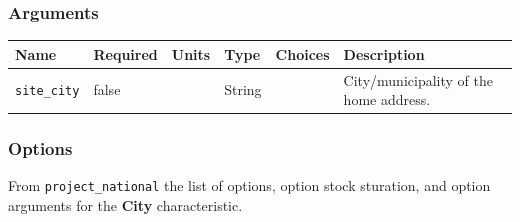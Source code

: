 \subsubsection{Arguments}\label{arguments-5}

\begin{longtable}[]{@{}llllll@{}}
\toprule\noalign{}
Name & Required & Units & Type & Choices & Description \\
\midrule\noalign{}
\endhead
\bottomrule\noalign{}
\endlastfoot
\texttt{site\_city} & false & & String & & City/municipality of the home
address. \\
\end{longtable}

\subsubsection{Options}\label{options-14}

From \texttt{project\_national} the list of options, option stock
sturation, and option arguments for the \textbf{City} characteristic.

